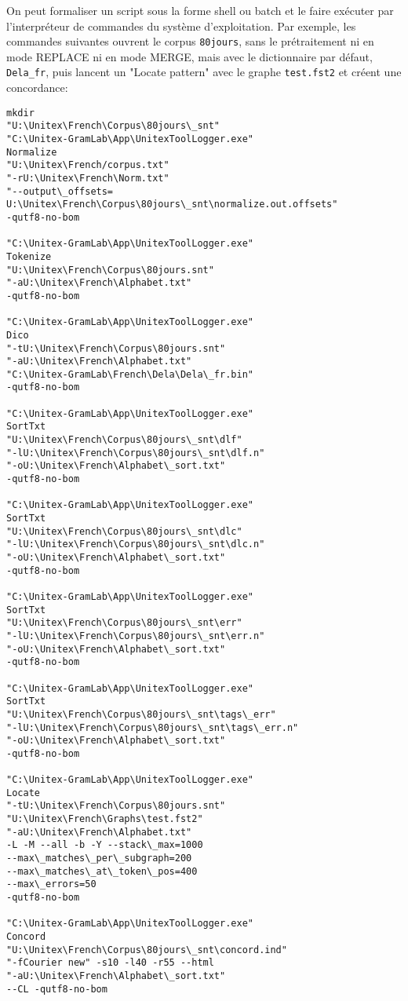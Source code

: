 On peut formaliser un script sous la forme shell ou batch et le faire exécuter par l'interpréteur de
commandes du système d'exploitation. Par exemple, les commandes suivantes ouvrent le corpus
\verb$80jours$, sans le prétraitement ni en mode REPLACE ni en mode MERGE, mais avec le dictionnaire
par défaut, \verb$Dela_fr$, puis lancent un "Locate pattern" avec le graphe \verb$test.fst2$
et créent une concordance:

\begin{verbatim}
mkdir 
"U:\Unitex\French\Corpus\80jours\_snt" 
"C:\Unitex-GramLab\App\UnitexToolLogger.exe" 
Normalize 
"U:\Unitex\French/corpus.txt" 
"-rU:\Unitex\French\Norm.txt" 
"--output\_offsets=
U:\Unitex\French\Corpus\80jours\_snt\normalize.out.offsets" 
-qutf8-no-bom

"C:\Unitex-GramLab\App\UnitexToolLogger.exe" 
Tokenize 
"U:\Unitex\French\Corpus\80jours.snt" 
"-aU:\Unitex\French\Alphabet.txt" 
-qutf8-no-bom

"C:\Unitex-GramLab\App\UnitexToolLogger.exe" 
Dico 
"-tU:\Unitex\French\Corpus\80jours.snt" 
"-aU:\Unitex\French\Alphabet.txt" 
"C:\Unitex-GramLab\French\Dela\Dela\_fr.bin" 
-qutf8-no-bom

"C:\Unitex-GramLab\App\UnitexToolLogger.exe" 
SortTxt 
"U:\Unitex\French\Corpus\80jours\_snt\dlf" 
"-lU:\Unitex\French\Corpus\80jours\_snt\dlf.n" 
"-oU:\Unitex\French\Alphabet\_sort.txt" 
-qutf8-no-bom

"C:\Unitex-GramLab\App\UnitexToolLogger.exe" 
SortTxt 
"U:\Unitex\French\Corpus\80jours\_snt\dlc" 
"-lU:\Unitex\French\Corpus\80jours\_snt\dlc.n" 
"-oU:\Unitex\French\Alphabet\_sort.txt" 
-qutf8-no-bom

"C:\Unitex-GramLab\App\UnitexToolLogger.exe" 
SortTxt 
"U:\Unitex\French\Corpus\80jours\_snt\err" 
"-lU:\Unitex\French\Corpus\80jours\_snt\err.n" 
"-oU:\Unitex\French\Alphabet\_sort.txt" 
-qutf8-no-bom

"C:\Unitex-GramLab\App\UnitexToolLogger.exe" 
SortTxt 
"U:\Unitex\French\Corpus\80jours\_snt\tags\_err" 
"-lU:\Unitex\French\Corpus\80jours\_snt\tags\_err.n" 
"-oU:\Unitex\French\Alphabet\_sort.txt" 
-qutf8-no-bom

"C:\Unitex-GramLab\App\UnitexToolLogger.exe" 
Locate 
"-tU:\Unitex\French\Corpus\80jours.snt" 
"U:\Unitex\French\Graphs\test.fst2" 
"-aU:\Unitex\French\Alphabet.txt" 
-L -M --all -b -Y --stack\_max=1000 
--max\_matches\_per\_subgraph=200 
--max\_matches\_at\_token\_pos=400 
--max\_errors=50 
-qutf8-no-bom

"C:\Unitex-GramLab\App\UnitexToolLogger.exe" 
Concord 
"U:\Unitex\French\Corpus\80jours\_snt\concord.ind" 
"-fCourier new" -s10 -l40 -r55 --html 
"-aU:\Unitex\French\Alphabet\_sort.txt" 
--CL -qutf8-no-bom
\end{verbatim}

